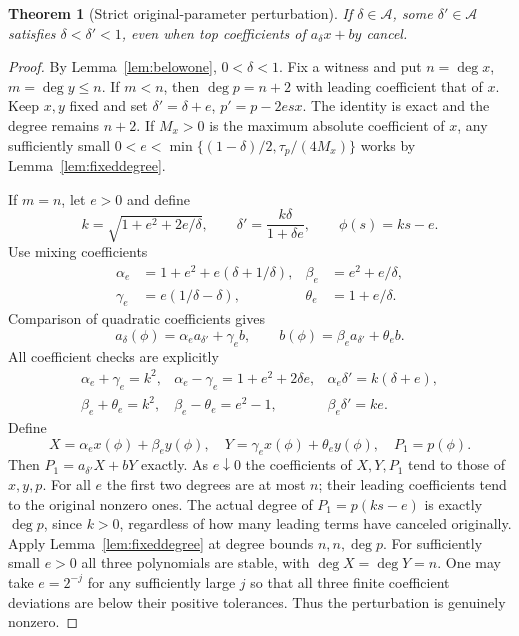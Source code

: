 \documentclass[11pt,a4paper]{article}
\newtheorem{theorem}{Theorem}[section]
\theoremstyle{definition}\newtheorem{definition}[theorem]{Definition}
\theoremstyle{remark}\newtheorem{remark}[theorem]{Remark}
\newcommand{\Adm}{\mathcal A}\newcommand{\F}{\mathcal F}
\begin{document}
\begin{theorem}[Strict original-parameter perturbation]\label{thm:perturb}
If $\delta\in\Adm$, some $\delta'\in\Adm$ satisfies
$\delta<\delta'<1$, even when top coefficients of $a_\delta x+by$ cancel.
\end{theorem}
\begin{proof}
By Lemma~\ref{lem:belowone}, $0<\delta<1$. Fix a witness and put
$n=\deg x$, $m=\deg y\leq n$.
If $m<n$, then $\deg p=n+2$ with leading coefficient that of $x$.
Keep $x,y$ fixed and set $\delta'=\delta+e$,
$p'=p-2esx$. The identity is exact and the degree remains $n+2$.
If $M_x>0$ is the maximum absolute coefficient of $x$, any sufficiently
small $0<e<\min\{(1-\delta)/2,\tau_p/(4M_x)\}$ works by
Lemma~\ref{lem:fixeddegree}.

If $m=n$, let $e>0$ and define
\begin{equation}\label{eq:mixparams}
 k=\sqrt{1+e^2+2e/\delta},\qquad
 \delta'=\frac{k\delta}{1+\delta e},\qquad\phi(s)=ks-e.
\end{equation}
Use mixing coefficients
\begin{equation}\label{eq:mixcoeff}
\begin{aligned}
 \alpha_e&=1+e^2+e(\delta+1/\delta),&\beta_e&=e^2+e/\delta,\\
 \gamma_e&=e(1/\delta-\delta),&\theta_e&=1+e/\delta.
\end{aligned}
\end{equation}
Comparison of quadratic coefficients gives
\begin{equation}\label{eq:mixids}
 a_\delta(\phi)=\alpha_e a_{\delta'}+\gamma_e b,
 \qquad b(\phi)=\beta_e a_{\delta'}+\theta_e b.
\end{equation}
All coefficient checks are explicitly
\[
\begin{array}{lll}
 \alpha_e+\gamma_e=k^2,&\alpha_e-\gamma_e=1+e^2+2\delta e,
 &\alpha_e\delta'=k(\delta+e),\\
 \beta_e+\theta_e=k^2,&\beta_e-\theta_e=e^2-1,
 &\beta_e\delta'=ke.
\end{array}
\]
Define
\begin{equation}\label{eq:mixwitness}
 X=\alpha_e x(\phi)+\beta_e y(\phi),\quad
 Y=\gamma_e x(\phi)+\theta_e y(\phi),\quad P_1=p(\phi).
\end{equation}
Then $P_1=a_{\delta'}X+bY$ exactly. As $e\downarrow0$ the coefficients
of $X,Y,P_1$ tend to those of $x,y,p$. For all $e$ the first two degrees
are at most $n$; their leading coefficients tend to the original nonzero
ones. The actual degree of $P_1=p(ks-e)$ is exactly $\deg p$, since
$k>0$, regardless of how many leading terms have canceled originally.
Apply Lemma~\ref{lem:fixeddegree} at degree bounds $n,n,\deg p$.
For sufficiently small $e>0$ all three polynomials are stable, with
$\deg X=\deg Y=n$. One may take $e=2^{-j}$ for any sufficiently large
$j$ so that all three finite coefficient deviations are below their
positive tolerances. Thus the perturbation is genuinely nonzero.


\end{proof}
\end{document}
